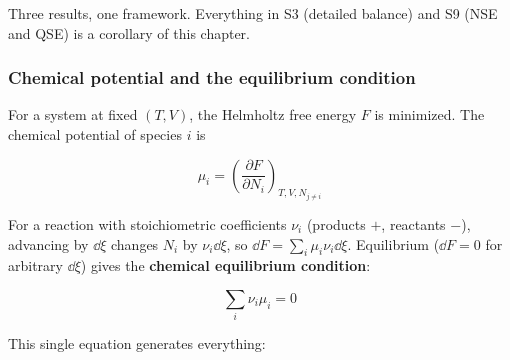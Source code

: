 Three results, one framework. Everything in S3 (detailed balance) and S9 (NSE
and QSE) is a corollary of this chapter.

\subsubsection{Chemical potential and the equilibrium condition}
\label{sec:chempotential}

For a system at fixed $(T, V)$, the Helmholtz free energy $F$ is minimized. The
chemical potential of species $i$ is

\begin{equation*}
\mu_i = \left(\frac{\partial F}{\partial N_i}\right)_{T,V,N_{j\neq i}}
\end{equation*}

For a reaction with stoichiometric coefficients $\nu_i$ (products $+$,
reactants $-$), advancing by $\dd\xi$ changes $N_i$ by $\nu_i \dd\xi$, so
$\dd F = \sum_i \mu_i \nu_i \dd\xi$. Equilibrium ($\dd F = 0$ for arbitrary
$\dd\xi$) gives the \textbf{chemical equilibrium condition}:

\begin{equation}
\sum_i \nu_i \mu_i = 0
\label{eq:chem-equilibrium}
\end{equation}

This single equation generates everything:

